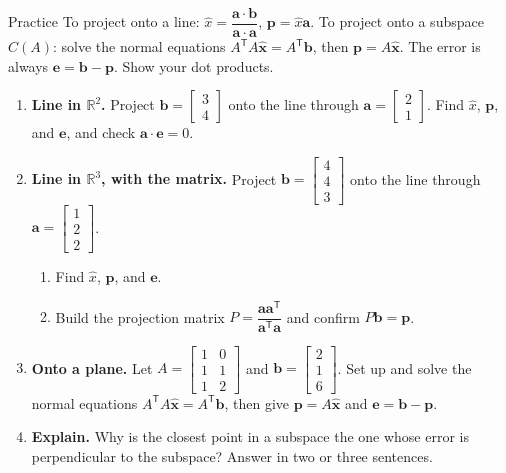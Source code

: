 \documentclass[10pt]{article}
\newcommand{\xx}{\mathbf{x}}
\newcommand{\bb}{\mathbf{b}}
\newcommand{\pp}{\mathbf{p}}
\newcommand{\ee}{\mathbf{e}}
\newcommand{\avec}{\mathbf{a}}
\newcommand{\T}{\mathsf{T}}
\begin{document}
\namedateperiod

\vspace{0.12in}

\begin{notesbox}{Practice}
To project onto a line: $\hat{x}=\dfrac{\avec\cdot\bb}{\avec\cdot\avec}$, $\pp=\hat{x}\avec$. To project
onto a subspace $C(A)$: solve the normal equations $A^{\T}A\hat{\xx}=A^{\T}\bb$, then $\pp=A\hat{\xx}$.
The error is always $\ee=\bb-\pp$. Show your dot products.

\begin{enumerate}[leftmargin=1.9em, itemsep=11pt]
  \item \textbf{Line in $\mathbb{R}^2$.} Project $\bb=\begin{bmatrix} 3\\4 \end{bmatrix}$ onto the line
        through $\avec=\begin{bmatrix} 2\\1 \end{bmatrix}$. Find $\hat{x}$, $\pp$, and $\ee$, and check
        $\avec\cdot\ee=0$. 
  \item \textbf{Line in $\mathbb{R}^3$, with the matrix.} Project $\bb=\begin{bmatrix} 4\\4\\3 \end{bmatrix}$
        onto the line through $\avec=\begin{bmatrix} 1\\2\\2 \end{bmatrix}$.
    \begin{enumerate}[label=(\alph*), leftmargin=1.8em, itemsep=5pt]
      \item Find $\hat{x}$, $\pp$, and $\ee$. \vspace{0.9cm}
      \item Build the projection matrix $P=\dfrac{\avec\avec^{\T}}{\avec^{\T}\avec}$ and confirm $P\bb=\pp$.
            \vspace{0.9cm}
    \end{enumerate}
  \item \textbf{Onto a plane.} Let $A=\begin{bmatrix} 1 & 0\\ 1 & 1\\ 1 & 2 \end{bmatrix}$ and
        $\bb=\begin{bmatrix} 2\\1\\6 \end{bmatrix}$. Set up and solve the normal equations
        $A^{\T}A\hat{\xx}=A^{\T}\bb$, then give $\pp=A\hat{\xx}$ and $\ee=\bb-\pp$. 
  \item \textbf{Explain.} Why is the closest point in a subspace the one whose error is perpendicular to
        the subspace? Answer in two or three sentences. 
\end{enumerate}
\end{notesbox}
\end{document}
